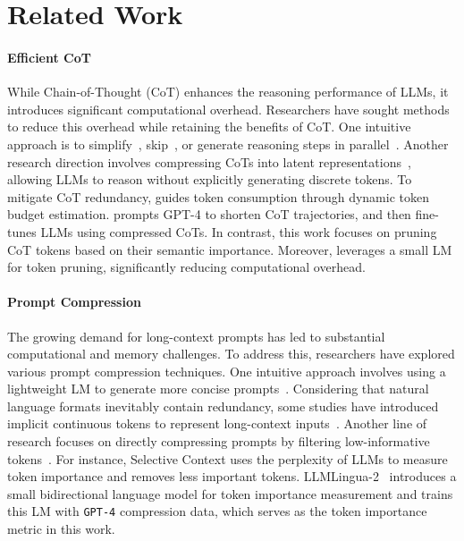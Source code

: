 \section{Related Work}

\paragraph{Efficient CoT} While Chain-of-Thought (CoT) enhances the reasoning performance of LLMs, it introduces significant computational overhead. Researchers have sought methods to reduce this overhead while retaining the benefits of CoT. One intuitive approach is to simplify~\cite{marconato2024not}, skip~\cite{Ding:2024cotshortcut, liu2024skipstep}, or generate reasoning steps in parallel~\cite{ning2023skeleton}. Another research direction involves compressing CoTs into latent representations~\cite{goyal2024think, deng2024explicit, hao2024training, cheng2024compressed}, allowing LLMs to reason without explicitly generating discrete tokens. To mitigate CoT redundancy, \citet{han2024token} guides token consumption through dynamic token budget estimation. \citet{kang2024c3ot} prompts GPT-4 to shorten CoT trajectories, and then fine-tunes LLMs using compressed CoTs. In contrast, this work focuses on pruning CoT tokens based on their semantic importance. Moreover, \method leverages a small LM for token pruning, significantly reducing computational overhead.

\paragraph{Prompt Compression} The growing demand for long-context prompts has led to substantial computational and memory challenges. To address this, researchers have explored various prompt compression techniques. One intuitive approach involves using a lightweight LM to generate more concise prompts~\cite{chuang-etal-2024-learning}. Considering that natural language formats inevitably contain redundancy, some studies have introduced implicit continuous tokens to represent long-context inputs~\cite{chevalier-etal-2023-adapting, ge2024incontext, mohtashami2023randomaccess}. Another line of research focuses on directly compressing prompts by filtering low-informative tokens~\cite{li:2023selective, jiang2023:llmlingua, pan:2024llmlingua2}. For instance, Selective Context uses the perplexity of LLMs to measure token importance and removes less important tokens. LLMLingua-2~\cite{pan:2024llmlingua2} introduces a small bidirectional language model for token importance measurement and trains this LM with \texttt{GPT-4} compression data, which serves as the token importance metric in this work.